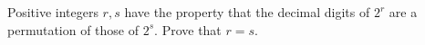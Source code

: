 Positive integers $r,s$ have the property that the decimal digits of $2^r$ are a permutation of those of $2^s$. Prove that $r=s$.
